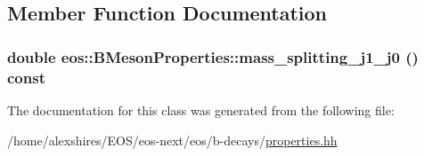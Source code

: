 \subsection{Member Function Documentation}
\hypertarget{classeos_1_1BMesonProperties_aa79a7d1ef74dacb2c3b393ca9ad18225}{
\subsubsection[{mass\_\-splitting\_\-j1\_\-j0}]{\setlength{\rightskip}{0pt plus 5cm}double eos::BMesonProperties::mass\_\-splitting\_\-j1\_\-j0 () const}}
\label{classeos_1_1BMesonProperties_aa79a7d1ef74dacb2c3b393ca9ad18225}


The documentation for this class was generated from the following file:\begin{DoxyCompactItemize}
\item 
/home/alexshires/EOS/eos-\/next/eos/b-\/decays/\hyperlink{properties_8hh}{properties.hh}\end{DoxyCompactItemize}
